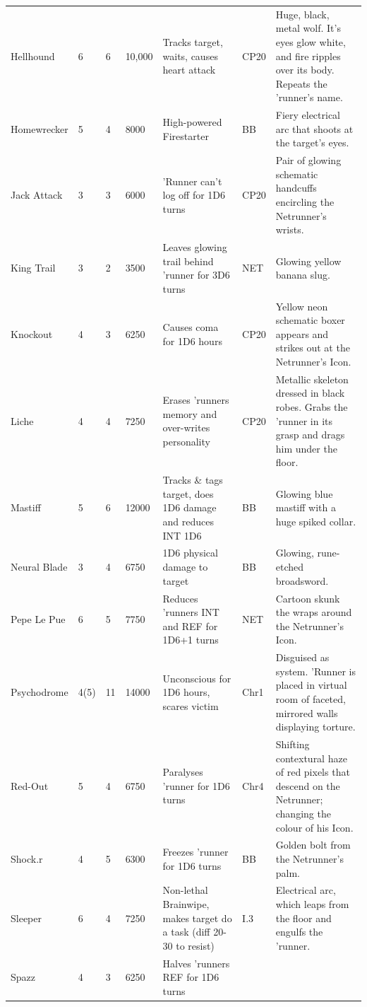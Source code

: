 \documentclass[11pt,twoside,a4paper]{article}
\begin{document}
\begin{landscape}
\begin{longtable}[ht]{ p{3.00cm} p{0.75cm} p{0.75cm} p{1.25cm} p{10.00cm} p{0.75cm} p{7.50cm} }
	Hellhound				&	6	&	6	&	10,000	&	Tracks target, waits, causes heart attack	
		&	CP20	&		Huge, black, metal wolf. It's eyes glow white, and fire ripples over its body. Repeats the 'runner's name.	\\
	Homewrecker				&	5	&	4	&	8000	&	High-powered Firestarter	
		&	BB	&		Fiery electrical arc that shoots at the target's eyes.	\\
	Jack Attack				&	3	&	3	&	6000	&	'Runner can't log off for 1D6 turns	
		&	CP20	&		Pair of glowing schematic handcuffs encircling the Netrunner's wrists.	\\
	King Trail				&	3	&	2	&	3500	&	Leaves glowing trail behind 'runner for 3D6 turns	
		&	NET	&		Glowing yellow banana slug.	\\
	Knockout				&	4	&	3	&	6250	&	Causes coma for 1D6 hours	
		&	CP20	&		Yellow neon schematic boxer appears and strikes out at the Netrunner's Icon.	\\
	Liche					&	4	&	4	&	7250	&	Erases 'runners memory and over-writes personality	
		&	CP20	&		Metallic skeleton dressed in black robes. Grabs the 'runner in its grasp and drags him under the floor.	\\
	Mastiff					&	5	&	6	&	12000	&	Tracks \& tags target, does 1D6 damage and reduces INT 1D6	
		&	BB	&		Glowing blue mastiff with a huge spiked collar.	\\
	Neural Blade			&	3	&	4	&	6750	&	1D6 physical damage to target	
		&	BB	&		Glowing, rune-etched broadsword.	\\
	Pepe Le Pue				&	6	&	5	&	7750	&	Reduces 'runners INT and REF for 1D6+1 turns	
		&	NET	&		Cartoon skunk the wraps around the Netrunner's Icon.	\\
	Psychodrome				&	4(5)	&	11	&	14000	&	Unconscious for 1D6 hours, scares victim	
		&	Chr1	&		Disguised as system. 'Runner is placed in virtual room of faceted, mirrored walls displaying torture.	\\
	Red-Out					&	5	&	4	&	6750	&	Paralyses 'runner for 1D6 turns	
		&	Chr4	&		Shifting contextural haze of red pixels that descend on the Netrunner; changing the colour of his Icon.	\\
	Shock.r					&	4	&	5	&	6300	&	Freezes 'runner for 1D6 turns	
		&	BB	&		Golden bolt from the Netrunner's palm.	\\
	Sleeper					&	6	&	4	&	7250	&	Non-lethal Brainwipe, makes target do a task (diff 20-30 to resist)	
		&	I.3	&		Electrical arc, which leaps from the floor and engulfs the 'runner.	\\
	Spazz					&	4	&	3	&	6250	&	Halves 'runners REF for 1D6 turns	

\end{longtable}
\end{landscape}
\end{document}
